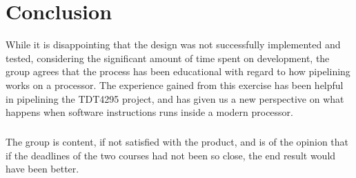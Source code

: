 \chapter{Conclusion}
While it is disappointing that the design was not successfully implemented and
tested, considering the significant amount of time spent on development, the
group agrees that the process has been educational with regard to how pipelining
works on a processor. The experience gained from this exercise has been helpful
in pipelining the TDT4295 project, and has given us a new perspective on what
happens when software instructions runs inside a modern processor.
\paragraph*{}
The group is content, if not satisfied with the product, and is of the opinion
that if the deadlines of the two courses had not been so close, the end result
would have been better.
